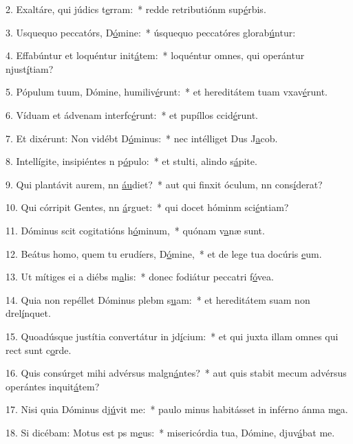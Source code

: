 2. Exaltáre, qui júdics t\uline{e}rram:~* redde retributiónm sup\uline{é}rbis.\par 
3. Usquequo peccatórs, D\uline{ó}mine:~* úsquequo peccatóres glorab\uline{ú}ntur:\par 
4. Effabúntur et loquéntur init\uline{á}tem:~* loquéntur omnes, qui operántur njust\uline{í}tiam?\par 
5. Pópulum tuum, Dómine, humiliv\uline{é}runt:~* et hereditátem tuam vxav\uline{é}runt.\par 
6. Víduam et ádvenam interfc\uline{é}runt:~* et pupíllos ccid\uline{é}runt.\par 
7. Et dixérunt: Non vidébt D\uline{ó}minus:~* nec intélliget Dus J\uline{a}cob.\par 
8. Intellígite, insipiéntes n p\uline{ó}pulo:~* et stulti, alindo s\uline{á}pite.\par 
9. Qui plantávit aurem, nn \uline{áu}diet?~* aut qui finxit óculum, nn cons\uline{í}derat?\par 
10. Qui córripit Gentes, nn \uline{á}rguet:~* qui docet hóminm sci\uline{é}ntiam?\par 
11. Dóminus scit cogitatións h\uline{ó}minum,~* quónam v\uline{a}næ sunt.\par 
12. Beátus homo, quem tu erudíers, D\uline{ó}mine,~* et de lege tua docúris \uline{e}um.\par 
13. Ut mítiges ei a diébs m\uline{a}lis:~* donec fodiátur peccatri f\uline{ó}vea.\par 
14. Quia non repéllet Dóminus plebm s\uline{u}am:~* et hereditátem suam non drel\uline{í}nquet.\par 
15. Quoadúsque justítia convertátur in jd\uline{í}cium:~* et qui juxta illam omnes qui rect sunt c\uline{o}rde.\par 
16. Quis consúrget mihi advérsus malgn\uline{á}ntes?~* aut quis stabit mecum advérsus operántes inquit\uline{á}tem?\par 
17. Nisi quia Dóminus dj\uline{ú}vit me:~* paulo minus habitásset in inférno ánma m\uline{e}a.\par 
18. Si dicébam: Motus est ps m\uline{e}us:~* misericórdia tua, Dómine, djuv\uline{á}bat me.\par 
